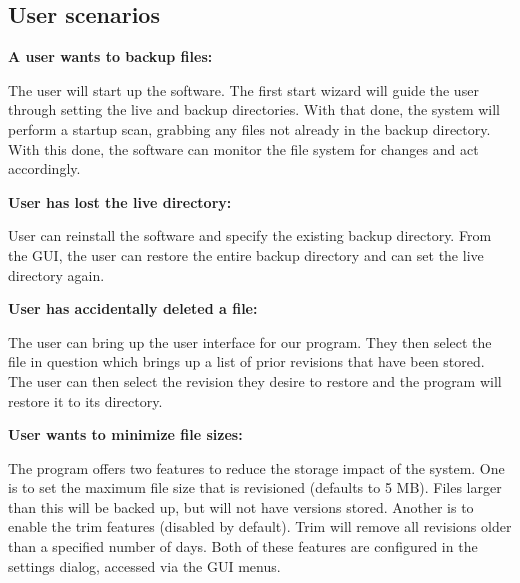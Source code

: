 \documentclass[12pt,a4paper]{article}
\begin{document}
\subsection{User scenarios}
\textbf{A user wants to backup files:}

The user will start up the software. The first start wizard will guide the user through setting the live and backup directories. With that done, the system will perform a startup scan, grabbing any files not already in the backup directory. With this done, the software can monitor the file system for changes and act accordingly.

\textbf{User has lost the live directory:}

User can reinstall the software and specify the existing backup directory. From the GUI, the user can restore the entire backup directory and can set the live directory again.

\textbf{User has accidentally deleted a file:}

The user can bring up the user interface for our program. They then select the file in question which brings up a list of prior revisions that have been stored. The user can then select the revision they desire to restore and the program will restore it to its directory.

\textbf{User wants to minimize file sizes:}

The program offers two features to reduce the storage impact of the system. One is to set the maximum file size that is revisioned (defaults to 5 MB). Files larger than this will be backed up, but will not have versions stored. Another is to enable the trim features (disabled by default). Trim will remove all revisions older than a specified number of days. Both of these features are configured in the settings dialog, accessed via the GUI menus.
\end{document}
